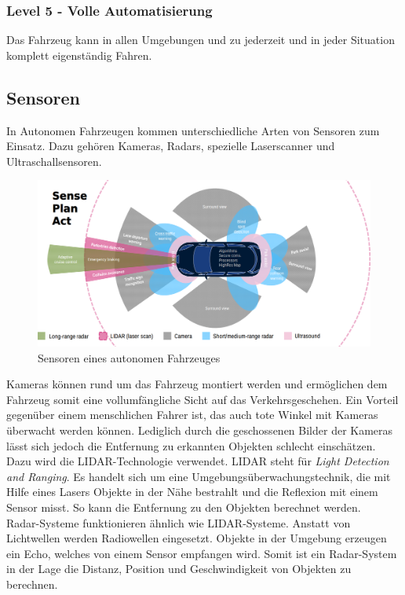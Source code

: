 \subsubsection*{Level 5 - Volle Automatisierung} Das Fahrzeug kann in allen Umgebungen und zu jederzeit und in jeder Situation komplett eigenständig Fahren.

\subsection{Sensoren}

In Autonomen Fahrzeugen kommen unterschiedliche Arten von Sensoren zum Einsatz. 
Dazu gehören Kameras, Radars, spezielle Laserscanner und Ultraschallsensoren.\\

\begin{figure}[H]
    \centering
    \includegraphics[width=.485\textwidth]{resources/images/sensors.png}
    \caption{Sensoren eines autonomen Fahrzeuges \cite{smith2015automated}}
\end{figure}

Kameras können rund um das Fahrzeug montiert werden und ermöglichen dem Fahrzeug somit eine vollumfängliche Sicht auf das Verkehrsgeschehen. Ein Vorteil gegenüber einem menschlichen Fahrer ist, das auch tote Winkel mit Kameras überwacht werden können. Lediglich durch die geschossenen Bilder der Kameras lässt sich jedoch die Entfernung zu erkannten Objekten schlecht einschätzen.\\

Dazu wird die LIDAR-Technologie \cite{himmelsbach2008lidar} verwendet. LIDAR steht für \textit{Light Detection and Ranging}. Es handelt sich um eine Umgebungsüberwachungstechnik, die mit Hilfe eines Lasers Objekte in der Nähe bestrahlt und die Reflexion mit einem Sensor misst. So kann die Entfernung zu den Objekten berechnet werden.\\

Radar-Systeme \cite{introductionToRadarSystems} funktionieren ähnlich wie LIDAR-Systeme. Anstatt von Lichtwellen werden Radiowellen eingesetzt. Objekte in der Umgebung erzeugen ein Echo, welches von einem Sensor empfangen wird. Somit ist ein Radar-System in der Lage die Distanz, Position und Geschwindigkeit von Objekten zu berechnen.\\

